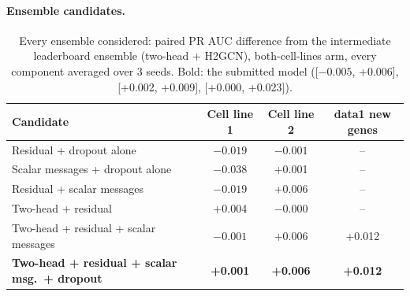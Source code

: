 \documentclass[11pt,a4paper]{article}
\begin{document}
\paragraph{Ensemble candidates.}
\begin{table}[H]
    \centering\small
    \begin{tabular}{lccc}
        \toprule
        \textbf{Candidate} & \textbf{Cell line 1} & \textbf{Cell line 2} & \textbf{data1 new genes} \\
        \midrule
        Residual + dropout alone & $-0.019$ & $-0.001$ & -- \\
        Scalar messages + dropout alone & $-0.038$ & +0.001 & -- \\
        Residual + scalar messages & $-0.019$ & +0.006 & -- \\
        Two-head + residual & +0.004 & $-0.000$ & -- \\
        Two-head + residual + scalar messages & $-0.001$ & +0.006 & +0.012 \\
        \textbf{Two-head + residual + scalar msg.\ + dropout} & \textbf{+0.001} & \textbf{+0.006} & \textbf{+0.012} \\
        \bottomrule
    \end{tabular}
    \caption{Every ensemble considered: paired PR AUC difference from the intermediate leaderboard
    ensemble (two-head + H2GCN), both-cell-lines arm, every component
    averaged over 3 seeds. Bold: the submitted model ([$-0.005$, +0.006],
    [+0.002, +0.009], [+0.000, +0.023]).}
    \label{tab:ensembles}
\end{table}
\end{document}
